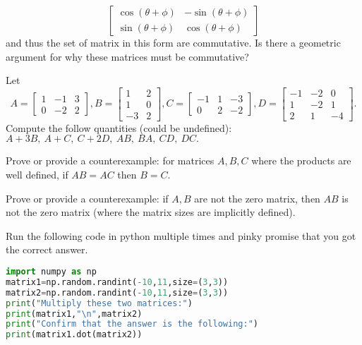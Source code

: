 \begin{exerciselist}
\[\begin{bmatrix}
			\cos (\theta+\phi) & -\sin (\theta+\phi)\\
			\sin (\theta+\phi) & \cos (\theta+\phi)
		\end{bmatrix}
	\]
	and thus the set of matrix in this form are commutative. Is there a geometric argument for why these matrices must be commutative? 
	\item Let \[
		A=\begin{bmatrix}
			1&-1&3\\0&-2&2
		\end{bmatrix},
		B=\begin{bmatrix}
			1&2\\1&0\\-3&2
		\end{bmatrix},
		C=\begin{bmatrix}
			-1&1&-3\\0&2&-2
		\end{bmatrix},
		D=\begin{bmatrix}
			-1 & -2&0\\1&-2&1\\2&1&-4
		\end{bmatrix}.
		\]
		Compute the follow quantities (could be undefined): $A+3B,\ A+C,\ C+2D, \ AB, \ BA, \ CD, \ DC.$
		\item Prove or provide a counterexample: for matrices $A,B,C$ where the products are well defined, if $AB=AC$ then $B=C$.
		\item Prove or provide a counterexample: if $A,B$ are not the zero matrix, then $AB$ is not the zero matrix (where the matrix sizes are implicitly defined).
	\item Run the following code in python multiple times and pinky promise that you got the correct answer.\\ \begin{lstlisting}[language=Python]
import numpy as np
matrix1=np.random.randint(-10,11,size=(3,3))
matrix2=np.random.randint(-10,11,size=(3,3))
print("Multiply these two matrices:")
print(matrix1,"\n",matrix2)
print("Confirm that the answer is the following:")
print(matrix1.dot(matrix2))\end{lstlisting}
\end{exerciselist}
